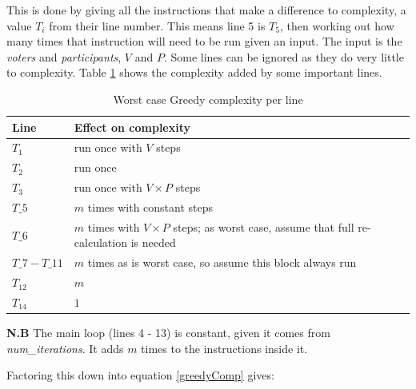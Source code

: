 \documentclass[12pt]{report}
\begin{document}
This is done by giving all the instructions that make a difference to complexity, a value $T_i$ from their line number. This means line 5 is $T_5$, then working out how many times that instruction will need to be run given an input. The input is the \textit{voters} and \textit{participants}, $V$ and $P$. Some lines can be ignored as they do very little to complexity. Table \ref{greedyLines} shows the complexity added by some important lines.

\begin{table}[H]
\centering
\caption{Worst case Greedy complexity per line}
\label{greedyLines}
\begin{tabular}{@{}|l|l|@{}}
\toprule
Line               & Effect on complexity                                                                        \\ \midrule
$T_1$              & run once with $V$ steps                                                                     \\ \midrule
$T_2$              & run once                                                                                    \\ \midrule
$T_3$              & run once with $V \times P$ steps                                                            \\ \midrule
$T\_5$             & $m$ times with constant steps                                                               \\ \midrule
$T\_6$             & $m$ times with $V \times P$ steps; as worst case, assume that full re-calculation is needed \\ \midrule
$T\_7 - T\_{11}$ & $m$ times as is worst case, so assume this block always run                                 \\ \midrule
$T_{12}$           & $m$                                                                                         \\ \midrule
$T_{14}$           & $1$                                                                                         \\ \bottomrule
\end{tabular}
\end{table}

\textbf{N.B} The main loop (lines 4 - 13) is constant, given it comes from \textit{num\_iterations}. It adds $m$ times to the instructions inside it.

Factoring this down into equation \ref{greedyComp} gives: 
\end{document}
